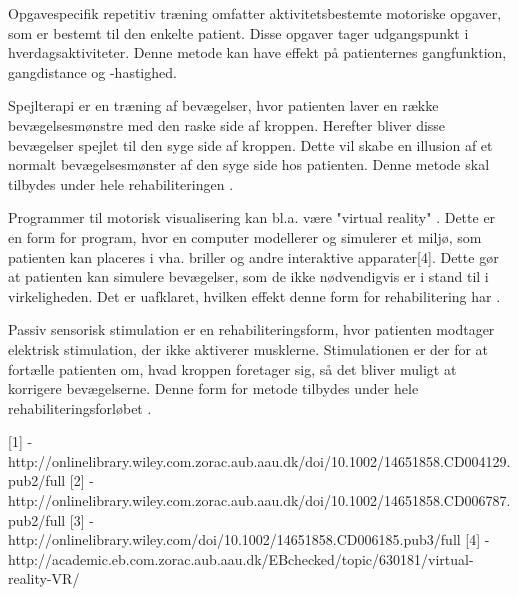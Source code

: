 Opgavespecifik repetitiv træning omfatter aktivitetsbestemte motoriske opgaver, som er bestemt til den enkelte patient. Disse opgaver tager udgangspunkt i hverdagsaktiviteter. Denne metode kan have effekt på patienternes gangfunktion, gangdistance og -hastighed. \cite{Sundhedsstyrelsen2010}

Spejlterapi er en træning af bevægelser, hvor patienten laver en række bevægelsesmønstre med den raske side af kroppen. Herefter bliver disse bevægelser spejlet til den syge side af kroppen. Dette vil skabe en illusion af et normalt bevægelsesmønster af den syge side hos patienten. \cite{Sundhedsstyrelsen2010} Denne metode skal tilbydes under hele rehabiliteringen \cite{Sundhedsstyrelsen2011a}.

Programmer til motorisk visualisering kan bl.a. være "virtual reality" \cite{Sundhedsstyrelsen2010}. Dette er en form for program, hvor en computer modellerer og simulerer et miljø, som patienten kan placeres i vha. briller og andre interaktive apparater[4]. Dette gør at patienten kan simulere bevægelser, som de ikke nødvendigvis er i stand til i virkeligheden. Det er uafklaret, hvilken effekt denne form for rehabilitering har \cite{Sundhedsstyrelsen2010}.

Passiv sensorisk stimulation er en rehabiliteringsform, hvor patienten modtager elektrisk stimulation, der ikke aktiverer musklerne. Stimulationen er der for at fortælle patienten om, hvad kroppen foretager sig, så det bliver muligt at korrigere bevægelserne. \cite{Sundhedsstyrelsen2010} Denne form for metode tilbydes under hele rehabiliteringsforløbet \cite{Sundhedsstyrelsen2011a}.



[1] - http://onlinelibrary.wiley.com.zorac.aub.aau.dk/doi/10.1002/14651858.CD004129.pub2/full
[2] - http://onlinelibrary.wiley.com.zorac.aub.aau.dk/doi/10.1002/14651858.CD006787.pub2/full
[3] - http://onlinelibrary.wiley.com/doi/10.1002/14651858.CD006185.pub3/full
[4] - http://academic.eb.com.zorac.aub.aau.dk/EBchecked/topic/630181/virtual-reality-VR/

